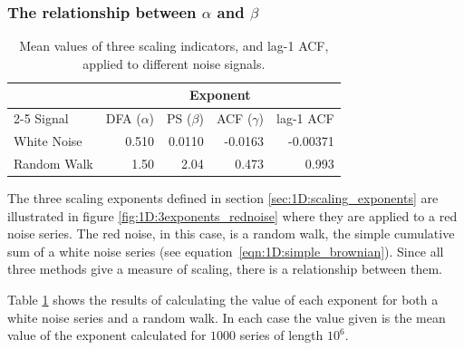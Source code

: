 {{}

\subsubsection{The relationship between $\alpha$ and $\beta$}
\label{subsec:1D:relationships:alpha_and_beta}
\begin{table}
	\centering
	\begin{tabular}{l  r r r r }
		\toprule
		& \multicolumn{4}{c}{Exponent} \\
		\cmidrule(r){2-5}
		Signal    & DFA ($\alpha$) & PS ($\beta$) & ACF ($\gamma$) & lag-1 ACF  \\
		\midrule
		{White Noise} & 0.510 & 0.0110&-0.0163 & -0.00371 \\
		{Random Walk}   & 1.50  & 2.04 & 0.473  &  0.993\\
		\bottomrule
	\end{tabular}
	\caption{Mean values of three scaling indicators, and lag-1 ACF, applied to different noise signals.
	\label{tab:1D:exponent_relationships}}
\end{table}

The three scaling exponents defined in section \ref{sec:1D:scaling_exponents} are illustrated in figure \ref{fig:1D:3exponents_rednoise} where they are applied to a red noise series. The red noise, in this case, is a random walk, the simple cumulative sum of a white noise series (see equation~\ref{eqn:1D:simple_brownian}). Since all three methods give a measure of scaling, there is a relationship between them. 

Table \ref{tab:1D:exponent_relationships} shows the results of calculating the value of each exponent for both a white noise series and a random walk. In each case the value given is the mean value of the exponent calculated for $1000$ series of length $10^6$.
   
}
